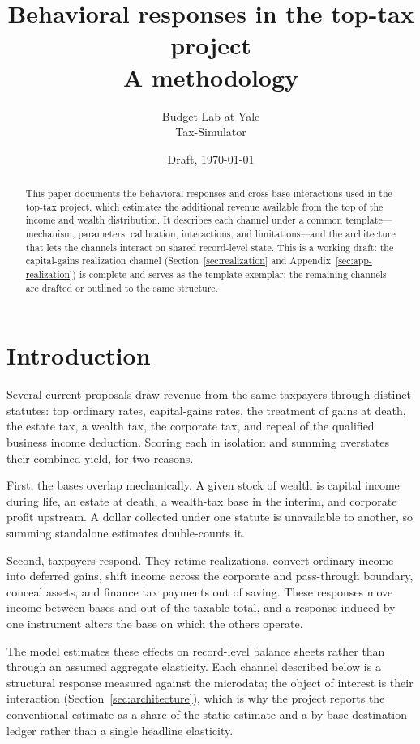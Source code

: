 \documentclass[11pt]{article}
\title{\textbf{Behavioral responses in the top-tax project}\\[0.3em]
\large A methodology}
\author{Budget Lab at Yale \\ \small Tax-Simulator}
\date{Draft, \today}
\begin{document}
\maketitle

\begin{abstract}
\noindent This paper documents the behavioral responses and cross-base
interactions used in the top-tax project, which estimates the additional
revenue available from the top of the income and wealth distribution. It
describes each channel under a common template---mechanism, parameters,
calibration, interactions, and limitations---and the architecture that lets the
channels interact on shared record-level state. This is a working draft: the
capital-gains realization channel (Section~\ref{sec:realization} and
Appendix~\ref{sec:app-realization}) is complete and serves as the template
exemplar; the remaining channels are drafted or outlined to the same structure.
\end{abstract}

\tableofcontents
\bigskip

\section{Introduction}
\label{sec:intro}

Several current proposals draw revenue from the same taxpayers through distinct
statutes: top ordinary rates, capital-gains rates, the treatment of gains at
death, the estate tax, a wealth tax, the corporate tax, and repeal of the
qualified business income deduction. Scoring each in isolation and summing
overstates their combined yield, for two reasons.

First, the bases overlap mechanically. A given stock of wealth is capital income
during life, an estate at death, a wealth-tax base in the interim, and corporate
profit upstream. A dollar collected under one statute is unavailable to another,
so summing standalone estimates double-counts it.

Second, taxpayers respond. They retime realizations, convert ordinary income
into deferred gains, shift income across the corporate and pass-through
boundary, conceal assets, and finance tax payments out of saving. These
responses move income between bases and out of the taxable total, and a response
induced by one instrument alters the base on which the others operate.

The model estimates these effects on record-level balance sheets rather than
through an assumed aggregate elasticity. Each channel described below is a
structural response measured against the microdata; the object of interest is
their interaction (Section~\ref{sec:architecture}), which is why the project
reports the conventional estimate as a share of the static estimate and a
by-base destination ledger rather than a single headline elasticity.
\end{document}
